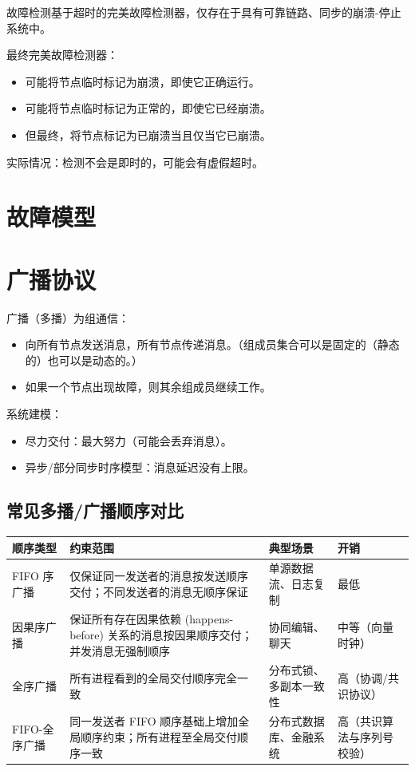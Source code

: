 故障检测基于超时的完美故障检测器，仅存在于具有可靠链路、同步的崩溃-停止系统中。

最终完美故障检测器：
\begin{itemize}
\item 可能将节点临时标记为崩溃，即使它正确运行。
\item 可能将节点临时标记为正常的，即使它已经崩溃。
\item 但最终，将节点标记为已崩溃当且仅当它已崩溃。
\end{itemize}

实际情况：检测不会是即时的，可能会有虚假超时。

\section{故障模型}

\section{广播协议}

广播（多播）为组通信：
\begin{itemize}
\item 向所有节点发送消息，所有节点传递消息。（组成员集合可以是固定的（静态的）也可以是动态的。）
\item 如果一个节点出现故障，则其余组成员继续工作。
\end{itemize}

系统建模：
\begin{itemize}
\item 尽力交付：最大努力（可能会丢弃消息）。
\item 异步/部分同步时序模型：消息延迟没有上限。
\end{itemize}

\subsection{常见多播/广播顺序对比}

\begin{table}[htbp]
\centering
\begin{tabular}{@{}llll@{}}
\toprule
顺序类型 & 约束范围 & 典型场景 & 开销 \\
\midrule
FIFO 序广播 & 仅保证同一发送者的消息按发送顺序交付；不同发送者的消息无顺序保证 & 单源数据流、日志复制 & 最低 \\
因果序广播 & 保证所有存在因果依赖 (happens-before) 关系的消息按因果顺序交付；并发消息无强制顺序 & 协同编辑、聊天 & 中等（向量时钟） \\
全序广播 & 所有进程看到的全局交付顺序完全一致 & 分布式锁、多副本一致性 & 高（协调/共识协议） \\
FIFO-全序广播 & 同一发送者 FIFO 顺序基础上增加全局顺序约束；所有进程至全局交付顺序一致 & 分布式数据库、金融系统 & 高（共识算法与序列号校验） \\
\bottomrule
\end{tabular}
\end{table}


